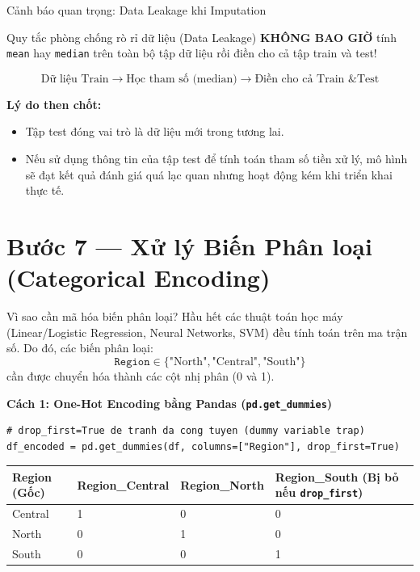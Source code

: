 \documentclass[aspectratio=169,11pt]{beamer}
\newcommand{\code}[1]{\texttt{#1}}
\newcommand{\smallgap}{\vspace{0.35em}}
\begin{document}
\begin{frame}{Cảnh báo quan trọng: Data Leakage khi Imputation}
\begin{alertblock}{Quy tắc phòng chống rò rỉ dữ liệu (Data Leakage)}
\textbf{KHÔNG BAO GIỜ} tính \code{mean} hay \code{median} trên toàn bộ tập dữ liệu rồi điền cho cả tập train và test!
\end{alertblock}

\smallgap
\begin{center}
\large
\[
\text{Dữ liệu Train} \longrightarrow \text{Học tham số (median)} \longrightarrow \text{Điền cho cả Train \& Test}
\]
\end{center}

\smallgap
\textbf{Lý do then chốt:}
\begin{itemize}
  \item Tập test đóng vai trò là dữ liệu mới trong tương lai.
  \item Nếu sử dụng thông tin của tập test để tính toán tham số tiền xử lý, mô hình sẽ đạt kết quả đánh giá quá lạc quan nhưng hoạt động kém khi triển khai thực tế.
\end{itemize}
\end{frame}

\section{Bước 7 — Xử lý Biến Phân loại (Categorical Encoding)}

\begin{frame}[fragile]{Vì sao cần mã hóa biến phân loại?}
Hầu hết các thuật toán học máy (Linear/Logistic Regression, Neural Networks, SVM) đều tính toán trên ma trận số. Do đó, các biến phân loại:
\[
\code{Region} \in \{\text{"North"}, \text{"Central"}, \text{"South"}\}
\]
cần được chuyển hóa thành các cột nhị phân (0 và 1).

\smallgap
\textbf{Cách 1: One-Hot Encoding bằng Pandas (\code{pd.get\_dummies})}
\begin{lstlisting}[style=pythonstyle]
# drop_first=True de tranh da cong tuyen (dummy variable trap)
df_encoded = pd.get_dummies(df, columns=["Region"], drop_first=True)
\end{lstlisting}

\smallgap
\begin{tabularx}{\textwidth}{lXXX}
\toprule
\textbf{Region (Gốc)} & \textbf{Region\_Central} & \textbf{Region\_North} & \textbf{Region\_South} (Bị bỏ nếu \code{drop\_first}) \\
\midrule
Central & 1 & 0 & 0 \\
North & 0 & 1 & 0 \\
South & 0 & 0 & 1 \\
\bottomrule
\end{tabularx}
\end{frame}
\end{document}
